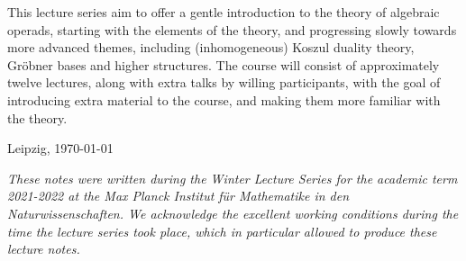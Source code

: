 \documentclass[fleqn, a4paper, twoside]{article}
\title{\vspace{-5 em}\setstretch{0.85}{\textbf{Algebraic operads, Koszul duality and Gr\"obner bases: an introduction}}}
\author{P. Tamaroff}
\date{August 22 and 24}
\newcommand{\0}{\langle 0\rangle}
\DeclareRobustCommand{\[}{\begin{equation}}%
\DeclareRobustCommand{\]}{\end{equation}}%
\theoremstyle{mytheorem}
\theoremstyle{introthm}
\theoremstyle{mydefinition}
\theoremstyle{mydefinition2}
\theoremstyle{plain} %
\newcommand{\?}{\,?\,}
\theoremstyle{mytheorem}
\theoremstyle{plain} %
\renewenvironment{abstract}{%
\small\begin{center}
\begin{minipage}{.9\textwidth}
}
{\par\noindent\end{minipage}\end{center}\vspace{3 em}}
\newcommand\blankpage{%
    \null
    \thispagestyle{empty}%
    \newpage}
\begin{document}
\maketitle


\thispagestyle{empty}

\begin{abstract}
This lecture series aim to offer a gentle introduction
to the theory of algebraic operads, starting with the
elements of the theory, and progressing slowly towards
more advanced themes, including (inhomogeneous)
Koszul duality theory, Gr\"obner bases and higher
structures. The course will consist of approximately
twelve lectures, along with extra talks by
willing participants, with the goal of introducing extra
material to the course, and making them more
familiar with the theory.
\end{abstract}


\vfill


\hfill	Leipzig, \today


\afterpage{\blankpage}

\newpage

\vspace*{\fill} 
\emph{These notes were written during the Winter Lecture
Series for the academic term 2021-2022 at the \emph{Max
Planck Institut f\"ur Mathematike in den Naturwissenschaften}.
We acknowledge the excellent working
conditions during the time the lecture series took place,
which in particular allowed to produce these lecture notes. }
\vspace*{\fill} 
 \afterpage{\blankpage}

\newpage

\thispagestyle{empty}
\end{document}
